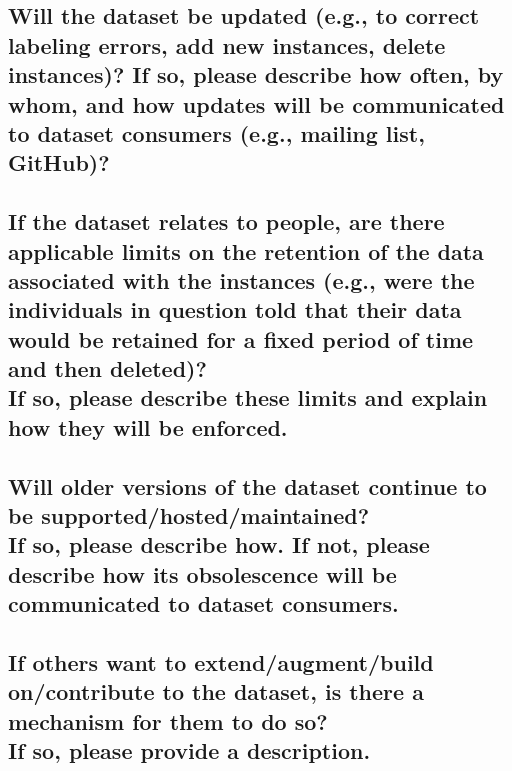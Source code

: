 \documentclass[letterpaper, 10 pt, conference]{ieeeconf}  %
\newcommand{\subtitle}[1]{{\\ \small \normalfont \color{purple} #1}}
\begin{document}
\lipsum[1]

\subsection{Will the dataset be updated (e.g., to correct labeling errors, add new instances, delete instances)? If so, please describe how often, by whom, and how updates will be communicated to dataset consumers (e.g., mailing list, GitHub)?}

\lipsum[1]

\subsection{If the dataset relates to people, are there applicable limits on the retention of the data associated with the instances (e.g., were the individuals in question told that their data would be retained for a fixed period of time and then deleted)? \subtitle{If so, please describe these limits and explain how they will be enforced.}}

\lipsum[1]

\subsection{Will older versions of the dataset continue to be supported/hosted/maintained? \subtitle{If so, please describe how. If not, please describe how its obsolescence will be communicated to dataset consumers. }}

\lipsum[1]

\subsection{If others want to extend/augment/build on/contribute to the dataset, is there a mechanism for them to do so? \subtitle{If so, please provide a description.}}

\lipsum[1]

\medskip
 
  

\end{document}
